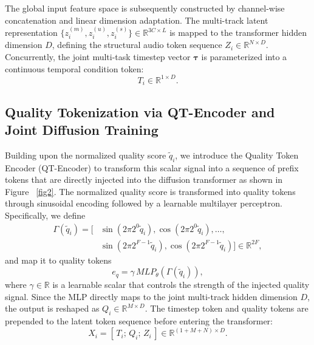 \documentclass[lettersize,journal]{IEEEtran}
\begin{document}
The global input feature space is subsequently constructed by channel-wise concatenation and linear dimension adaptation. The multi-track latent representation $\{z_i^{(m)}, z_i^{(u)}, z_i^{(s)}\} \in \mathbb{R}^{3C \times L}$ is mapped to the transformer hidden dimension $D$, defining the structural audio token sequence $Z_i \in \mathbb{R}^{N \times D}$. Concurrently, the joint multi-task timestep vector $\boldsymbol{\tau}$ is parameterized into a continuous temporal condition token: \begin{equation}
T_i \in \mathbb{R}^{1\times D}.
\end{equation}

\subsection{Quality Tokenization via QT-Encoder and Joint Diffusion Training}
\label{4.2}
Building upon the normalized quality score $\tilde{q}_i$, we introduce the Quality Token Encoder (QT-Encoder) to transform this scalar signal into a sequence of prefix tokens that are directly injected into the diffusion transformer as shown in Figure~ \ref{fig2}. The normalized quality score is transformed into quality tokens through sinusoidal encoding followed by a learnable multilayer perceptron. Specifically, we define
  \begin{equation}
  \begin{aligned}
    \Gamma(\tilde{q}_i) = \big[ & \sin(2\pi 2^0 \tilde{q}_i), \cos(2\pi 2^0 \tilde{q}_i), \ldots, \\
    & \sin(2\pi 2^{F-1}\tilde{q}_i), \cos(2\pi 2^{F-1}\tilde{q}_i) \big] \in \mathbb{R}^{2F},
  \end{aligned}
  \end{equation}
and map it to quality tokens
  \begin{equation}
    e_q=\gamma\,MLP_{\theta}(\Gamma(\tilde{q}_i)),
  \end{equation}
where $\gamma\in\mathbb{R}$ is a learnable scalar that controls the strength of the injected quality signal. Since the MLP directly maps to the joint multi-track hidden dimension $D$, the output is reshaped as $Q_i\in\mathbb{R}^{M\times D}$. The timestep token and quality tokens are prepended to the latent token sequence before entering the transformer:
  \begin{equation}
    X_i=[\,T_i;\,Q_i;\,Z_i\,] \in\mathbb{R}^{(1+M+N)\times D}.
  \end{equation}
\end{document}
